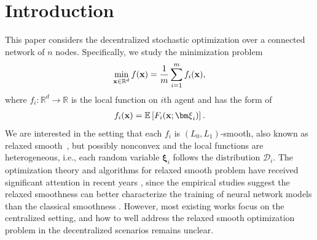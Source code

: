 \documentclass[sigconf]{acmart}
\def\vx{{\bf{x}}}
\def\fD{{\mathcal{D}}}
\def\BE{{\mathbb{E}}}
\def\BR{{\mathbb{R}}}
\theoremstyle{plain}
\def\vxi{{\bm\xi}}
\begin{document}



\maketitle

\section{Introduction}

This paper considers the decentralized stochastic optimization over a connected network of $n$ nodes. Specifically, we study the minimization problem
\begin{align*}
    \min_{\vx\in\BR^d} f(\vx)=\frac{1}{m}\sum_{i=1}^m f_i(\vx),
\end{align*}
where $f_i:\BR^d\to\BR$ is the local function on $i$th agent and has the form of 
\begin{align*}
f_i(\vx) = \BE\left[F_i(\vx;\vxi_i)\right].    
\end{align*}
We are interested in the setting that each $f_i$ is $(L_0,L_1)$-smooth, also known as relaxed smooth~\citep{zhang2020gradient}, but possibly nonconvex and the local functions are heterogeneous, i.e., each random variable $\vxi_i$ follows the distribution $\fD_i$. 
The optimization theory and algorithms for relaxed smooth problem have received significant attention in recent years \citep{chen2023generalized,vankov2024optimizing,li2024problem,li2023convergence,gaash2025convergence,gorbunov2024methods,koloskova2023revisiting,chezhegov2025convergence,tovmasyan2025revisiting,crawshaw2025complexity,lobanov2024linear,tyurin2024toward,reisizadeh2025variance,xie2024trust,zhang2020improved,yu2025mirror,khirirat2024error,khirirat2024communication,jiang2025decentralized,borodich2025nesterov}, 
since the empirical studies suggest the relaxed smoothness can better characterize the training of neural network models than the classical smoothness \citep{zhang2020gradient,cooper2024empirical,crawshaw2022robustness}.
However, most existing works focus on the centralized setting, and how to well address the relaxed smooth optimization problem in the decentralized scenarios remains unclear.
\end{document}
